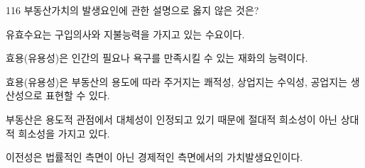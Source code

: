 \begin{question}{116}
부동산가치의 발생요인에 관한 설명으로 옳지 않은 것은?
\begin{choices}
  \item 유효수요는 구입의사와 지불능력을 가지고 있는 수요이다.
  \item 효용(유용성)은 인간의 필요나 욕구를 만족시킬 수 있는 재화의 능력이다.
  \item 효용(유용성)은 부동산의 용도에 따라 주거지는 쾌적성, 상업지는 수익성, 공업지는 생산성으로 표현할 수 있다.
  \item 부동산은 용도적 관점에서 대체성이 인정되고 있기 때문에 절대적 희소성이 아닌 상대적 희소성을 가지고 있다.
  \item 이전성은 법률적인 측면이 아닌 경제적인 측면에서의 가치발생요인이다.
\end{choices}
\end{question}
